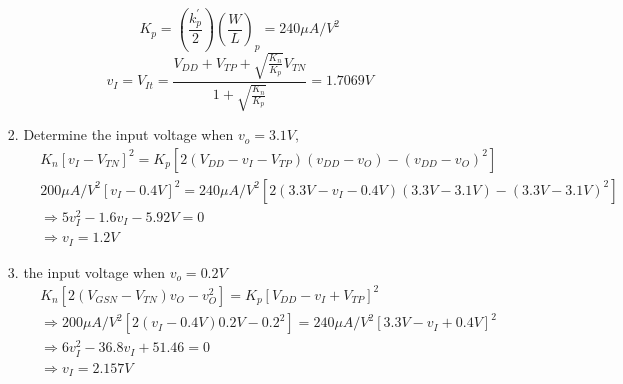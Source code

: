 \documentclass{article}
\begin{document}
\begin{enumerate}
\begin{enumerate}
\begin{enumerate}
\begin{equation}
            \end{equation}
            \begin{equation}
                K_p = \left(\frac{k_p^{'}}{2}\right)\left(\frac{W}{L}\right)_p = 240\mu A/V^2
            \end{equation}
            \begin{equation}
            v_I = V_{It} = \frac{V_{DD}+V_{TP}+\sqrt{\frac{K_n}{K_p}}V_{TN}}{1+\sqrt{\frac{K_n}{K_p}}}=\boxed{1.7069V}
        \end{equation}
            \item Determine the input voltage when $v_o = 3.1V,$
            \begin{align}
            &K_n[v_I-V_{TN}]^2=K_p[2(V_{DD}-v_I-V_{TP})(v_{DD}-v_O)-(v_{DD}-v_O)^2]\\
            &200\mu A/V^2[v_I-0.4V]^2=240\mu A/V^2[2(3.3V-v_I-0.4V)(3.3V-3.1V)-(3.3V-3.1V)^2]\\
            &\Rightarrow 5v_I^2-1.6v_I-5.92V=0\\
            &\Rightarrow v_I = \boxed{1.2V}
            \end{align}
            \item the input voltage when $v_o = 0.2V$
            \begin{align}
                &K_n[2(V_{GSN}-V_{TN})v_O-v_O^2]=K_p[V_{DD}-v_I+V_{TP}]^2\\
                &\Rightarrow200\mu A/V^2[2(v_{I}-0.4V)0.2V-0.2^2]=240\mu A/V^2[3.3V-v_I+0.4V]^2\\
                &\Rightarrow6v_I^2-36.8v_I+51.46=0\\
                &\Rightarrow v_I = \boxed{2.157V}
            \end{align}
        \end{enumerate}
    \end{enumerate}
\end{enumerate}
\end{document}
